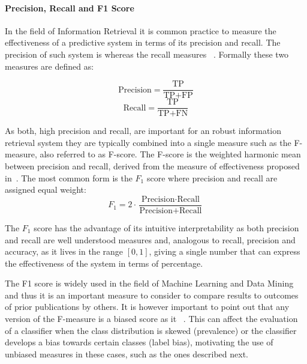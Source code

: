 \paragraph{Precision, Recall and F1 Score}
\label{par:Precision, Recall and F1 Score}

In the field of Information Retrieval it is common practice to measure the effectiveness of a predictive system in terms of its precision and recall.
The precision of such system is  whereas the recall measures ~\cite{Rijsbergen:1979aa}. Formally these two measures are defined as:

\begin{equation}
    \text{Precision} = \frac{\text{TP}}{\text{TP} + \text{FP}}
\end{equation}
\begin{equation}
    \text{Recall} = \frac{\text{TP}}{\text{TP} + \text{FN}}
\end{equation}


As both, high precision and recall, are important for an robust information retrieval system they are typically combined into a single measure such as the F-measure, also referred to as F-score. The F-score is the weighted harmonic mean between precision and recall, derived from the measure of effectiveness proposed in~\cite{Rijsbergen:1979aa}. The most common form is the $F_1$ score  where precision and recall are assigned equal weight:
\begin{equation}
  \label{f1measure}
  F_1 = 2 \cdot \frac{\text{Precision} \cdot \text{Recall}}{\text{Precision} + \text{Recall}}
\end{equation}

The $F_1$ score has the advantage of its intuitive interpretability as both precision and recall are well understood measures and, analogous to recall, precision and accuracy, as it lives in the range $[0,1]$, giving a single number that can express the effectiveness of the system in terms of percentage.

The F1 score is widely used in the field of Machine Learning and Data Mining and thus it is an important measure to consider to compare results to outcomes of prior publications by others.
It is however important to point out that any version of the F-measure is a biased score as it ~\cite{Powers:2011aa}. This can affect the evaluation of a classifier when the class distribution is skewed (prevalence) or the classifier develops a bias towards certain classes (label bias), motivating the use of unbiased measures in these cases, such as the ones described next.

